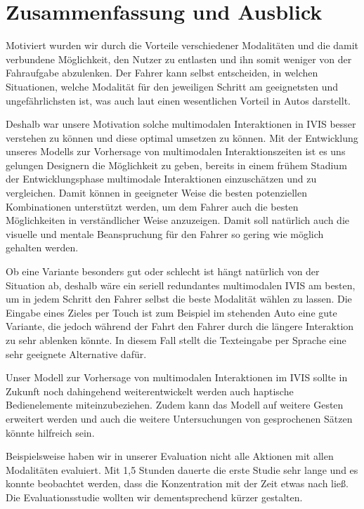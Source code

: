 \chapter{Zusammenfassung und Ausblick}\label{cha:Zusamenfassung}
Motiviert wurden wir durch die Vorteile verschiedener Modalitäten und die damit verbundene Möglichkeit, den Nutzer zu entlasten und ihn somit weniger von der Fahraufgabe abzulenken.
Der Fahrer kann selbst entscheiden, in welchen Situationen, welche Modalität für den jeweiligen Schritt am geeignetsten und ungefährlichsten ist, was auch laut \citet{Muller_2011} einen wesentlichen Vorteil in Autos darstellt.

Deshalb war unsere Motivation solche multimodalen Interaktionen in IVIS besser verstehen zu können und diese optimal umsetzen zu können. 
Mit der Entwicklung unseres Modells zur Vorhersage von multimodalen Interaktionszeiten ist es uns gelungen Designern die Möglichkeit zu geben, bereits in einem frühem Stadium der Entwicklungsphase multimodale Interaktionen einzuschätzen und zu vergleichen. 
Damit können in geeigneter Weise die besten potenziellen Kombinationen unterstützt werden, um dem Fahrer auch die besten Möglichkeiten in verständlicher Weise anzuzeigen. 
Damit soll natürlich auch die visuelle und mentale Beanspruchung für den Fahrer so gering wie möglich gehalten werden. 

Ob eine Variante besonders gut oder schlecht ist hängt natürlich von der Situation ab, deshalb wäre ein seriell redundantes multimodalen IVIS am besten, um in jedem Schritt den Fahrer selbst die beste Modalität wählen zu lassen. 
Die Eingabe eines Zieles per Touch ist zum Beispiel im stehenden Auto eine gute Variante, die jedoch während der Fahrt den Fahrer durch die längere Interaktion zu sehr ablenken könnte. 
In diesem Fall stellt die Texteingabe per Sprache eine sehr geeignete Alternative dafür.

Unser Modell zur Vorhersage von multimodalen Interaktionen im IVIS sollte in Zukunft noch dahingehend weiterentwickelt werden auch haptische Bedienelemente miteinzubeziehen. 
Zudem kann das Modell auf weitere Gesten erweitert werden und auch die weitere Untersuchungen von gesprochenen Sätzen könnte hilfreich sein.

Beispielsweise haben wir in unserer Evaluation nicht alle Aktionen mit allen Modalitäten evaluiert. Mit 1,5 Stunden dauerte die erste Studie sehr lange und es konnte beobachtet werden, dass die Konzentration mit der Zeit etwas nach ließ. Die Evaluationsstudie wollten wir dementsprechend kürzer gestalten. 

